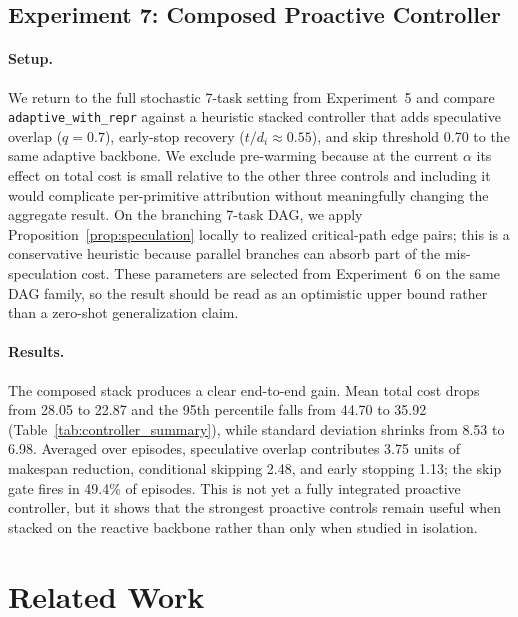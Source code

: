 \documentclass[10pt, twocolumn]{article}
\begin{document}
\subsection{Experiment 7: Composed Proactive Controller}

\paragraph{Setup.} We return to the full stochastic 7-task setting from Experiment~5 and compare \texttt{adaptive\_with\_repr} against a heuristic stacked controller that adds speculative overlap ($q=0.7$), early-stop recovery ($t/d_i \approx 0.55$), and skip threshold 0.70 to the same adaptive backbone. We exclude pre-warming because at the current $\alpha$ its effect on total cost is small relative to the other three controls and including it would complicate per-primitive attribution without meaningfully changing the aggregate result. On the branching 7-task DAG, we apply Proposition~\ref{prop:speculation} locally to realized critical-path edge pairs; this is a conservative heuristic because parallel branches can absorb part of the mis-speculation cost. These parameters are selected from Experiment~6 on the same DAG family, so the result should be read as an optimistic upper bound rather than a zero-shot generalization claim.

\paragraph{Results.} The composed stack produces a clear end-to-end gain. Mean total cost drops from 28.05 to 22.87 and the 95th percentile falls from 44.70 to 35.92 (Table~\ref{tab:controller_summary}), while standard deviation shrinks from 8.53 to 6.98. Averaged over episodes, speculative overlap contributes 3.75 units of makespan reduction, conditional skipping 2.48, and early stopping 1.13; the skip gate fires in 49.4\% of episodes. This is not yet a fully integrated proactive controller, but it shows that the strongest proactive controls remain useful when stacked on the reactive backbone rather than only when studied in isolation.

\section{Related Work}
\label{sec:related}
\end{document}
